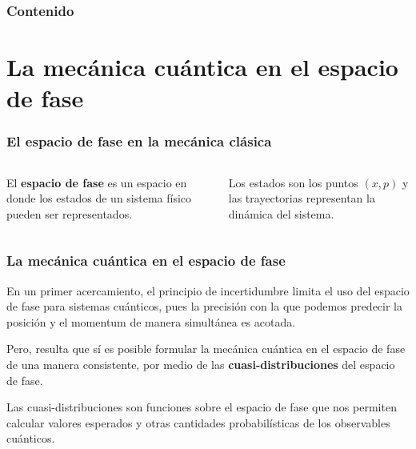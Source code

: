 \documentclass[10pt]{beamer}
\begin{document}
  \begin{frame}
    \frametitle{Contenido}
    \tableofcontents
  \end{frame}

  \section{La mecánica cuántica en el espacio de fase}

  \begin{frame}
    \frametitle{El espacio de fase en la mecánica clásica}

    \begin{columns}

      El \textbf{espacio de fase} es un espacio en donde los
      estados de un sistema físico pueden ser representados.

      \vspace{10pt}

      Los estados son los puntos $(x,p)$ y las trayectorias
      representan la dinámica del sistema.
    \end{columns}
  \end{frame}

  \begin{frame}
    \frametitle{La mecánica cuántica en el espacio de fase}

    En un primer acercamiento, el principio de incertidumbre
    limita el uso del espacio de fase para sistemas
    cuánticos, pues la precisión con la que podemos predecir
    la posición y el momentum de manera simultánea es
    acotada.

    \vspace{15pt}

    \pause

    Pero, resulta que sí es posible formular la mecánica
    cuántica en el espacio de fase de una manera
    consistente, por medio de las
    \textbf{cuasi-distribuciones} del espacio de fase.

    \vspace{15pt}

    \pause

    Las cuasi-distribuciones son funciones sobre el espacio
    de fase que nos permiten calcular valores esperados y
    otras cantidades probabilísticas de los observables
    cuánticos.
  \end{frame}
\end{document}

